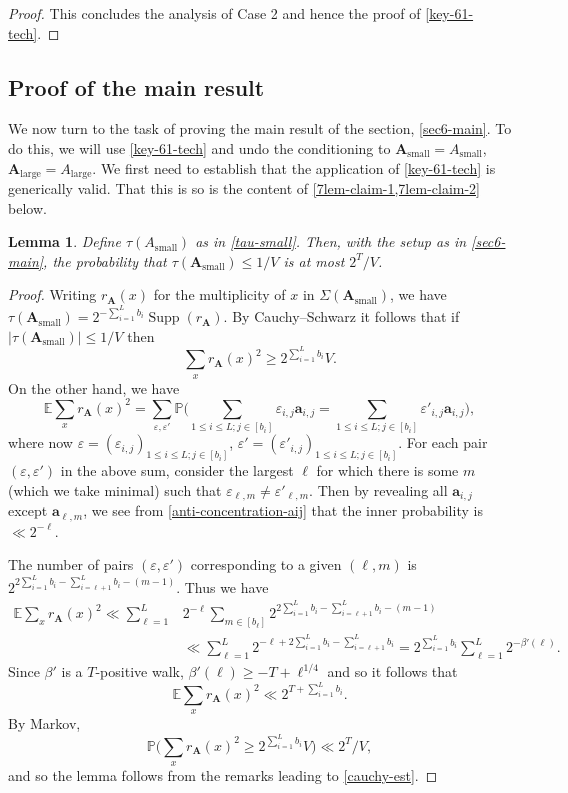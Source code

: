 \documentclass[11pt,reqno]{amsart}
\numberwithin{equation}{section}
\newtheorem{lemma}[theorem]{Lemma}
\theoremstyle{definition}
\theoremstyle{remark}
\newcommand{\mb}{\mathbb}
\newcommand{\mbf}{\mathbf}
\newcommand{\eps}{\varepsilon}
\newcommand\Supp{\operatorname{Supp}}
\renewcommand{\le}{\leqslant}
\renewcommand{\ge}{\geqslant}
\def\sml{\operatorname{small}}
\def\lrg{\operatorname{large}}
\begin{document}
\begin{proof}
This concludes the analysis of Case 2 and hence the proof of \cref{key-61-tech}.
\end{proof}

\subsection{Proof of the main result}

We now turn to the task of proving the main result of the section, \cref{sec6-main}.  To do this, we will use \cref{key-61-tech} and undo the conditioning to $\mbf{A}_{\sml} = A_{\sml}$, $\mbf{A}_{\lrg} = A_{\lrg}$.
We first need to establish that the application of \cref{key-61-tech} is generically valid. That this is so is the content of \cref{7lem-claim-1,7lem-claim-2} below.

\begin{lemma}\label{7lem-claim-1} Define $\tau(A_{\sml})$ as in \cref{tau-small}. Then, with the setup as in \cref{sec6-main}, the probability that $\tau(\mbf{A}_{\sml}) \le 1/V$ is at most $2^T/V$.\end{lemma}
\begin{proof}
Writing $r_{\mbf{A}}(x)$ for the multiplicity of $x$ in $\Sigma(\mbf{A}_{\sml})$, we have $\tau(\mbf{A}_{\sml}) = 2^{-\sum_{i =1}^{L} b_i} \Supp(r_{\mbf{A}})$. By Cauchy--Schwarz it follows that if $|\tau(\mbf{A}_{\sml})|\le 1/V$ then 
\begin{equation}\label{cauchy-est} \sum_{x} r_{\mbf{A}}(x)^2 \ge 2^{\sum_{i =1}^L b_i} V. \end{equation}
On the other hand, we have
\[ \mb{E}\sum_x  r_{\mbf{A}}(x)^2 = \sum_{\eps, \eps' } \mb{P}\big( \sum_{1 \le i \le L;j \in [b_i]} \eps_{i,j} \mathbf{a}_{i,j} =  \sum_{1 \le i \le L;j \in [b_i]} \eps'_{i,j} \mathbf{a}_{i,j}\big),\] where now $\eps = (\eps_{i,j})_{1 \le i \le L;j \in [b_i]}$, $\eps' = (\eps'_{i,j})_{1 \le i \le L;j \in [b_i]}$.
For each pair $(\eps, \eps')$ in the above sum, consider the largest $\ell$ for which there is some $m$ (which we take minimal) such that $\eps_{\ell,m} \neq \eps'_{\ell,m}$. Then by revealing all $\mathbf{a}_{i,j}$ except $\mathbf{a}_{\ell,m}$, we see from \cref{anti-concentration-aij} that the inner probability is $\ll 2^{-\ell}$.

The number of pairs $(\eps, \eps')$ corresponding to a given $(\ell, m)$ is $2^{ 2\sum_{i =1}^L b_i - \sum_{i = \ell + 1}^Lb_i - (m - 1)}$. 
Thus we have 
\begin{align*} 
\mb{E}\sum_x r_{\mbf{A}}(x)^2 \ll \sum_{\ell = 1}^L & 2^{-\ell} \sum_{m \in [b_{\ell}]} 2^{ 2\sum_{i =1}^L b_i - \sum_{i = \ell + 1}^L b_i - (m - 1)} \\ \nonumber  & \ll  \sum_{\ell =1}^L 2^{-\ell + 2\sum_{i=1}^L b_i - \sum_{i = \ell + 1}^L b_i}   = 2^{\sum_{i =1}^L b_i} \sum_{\ell =1}^L 2^{- \beta'(\ell)}.\end{align*}
Since $\beta'$ is a $T$-positive walk, $\beta'(\ell) \ge -T + \ell^{1/4}$ and so it follows that 
\[ \mb{E} \sum_x r_{\mbf{A}}(x)^2 \ll 2^{T + \sum_{i=1}^L b_i} .\] By Markov, 
\[ \mb{P} \big( \sum_x r_{\mbf{A}}(x)^2 \ge 2^{\sum_{i=1}^L  b_i} V\big) \ll 2^T/V,\] and so the lemma follows from the remarks leading to \cref{cauchy-est}.\end{proof}
\end{document}
